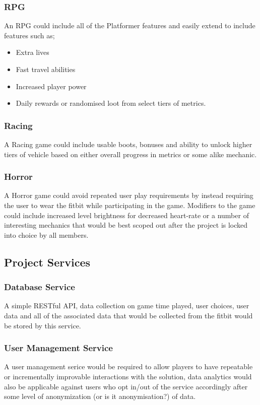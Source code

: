 \documentclass{article}
\begin{document}
        \subsubsection{RPG}
        An RPG could include all of the Platformer features and easily extend to include features such as;
        \begin{itemize}
            \item Extra lives
            \item Fast travel abilities
            \item Increased player power
            \item Daily rewards or randomised loot from select tiers of metrics.
        \end{itemize}

        \subsubsection{Racing}
        A Racing game could include usable boots, bonuses and ability to unlock higher tiers of vehicle 
        based on either overall progress in metrics or some alike mechanic.

        \subsubsection{Horror}
        A Horror game could avoid repeated user play requirements by instead requiring the user to wear the fitbit
        while participating in the game. Modifiers to the game could include increased level brightness for decreased 
        heart-rate or a number of interesting mechanics that would be best scoped out after the project is locked into
        choice by all members.
        
        \subsection{Project Services}
            \subsubsection{Database Service}
            A simple RESTful API, data collection on game time played, user choices, user data and all of the 
            associated data that would be collected from the fitbit would be stored by this service.

            \subsubsection{User Management Service}
            A user management serice would be required to allow players to have repeatable or incrementally
            improvable interactions with the solution, data analytics would also be applicable against users
            who opt in/out of the service accordingly after some level of anonymization (or is it anonymisation?) of data.
\end{document}
